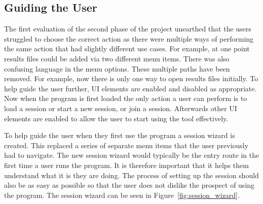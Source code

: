 \subsection{Guiding the User}

The first evaluation of the second phase of the project unearthed that the users struggled to choose the correct action as there were multiple ways of performing the same action that had slightly different use cases.  For example, at one point results files could be added via two different menu items.  There was also confusing language in the menu options.  These multiple paths have been removed. For example, now there is only one way to open results files initially.  To help guide the user further, \ac{UI} elements are enabled and disabled as appropriate.  Now when the program is first loaded the only action a user can perform is to load a session or start a new session, or join a session.  Afterwards other \ac{UI} elements are enabled to allow the user to start using the tool effectively.

To help guide the user when they first use the program a session wizard is created.  This replaced a series of separate menu items that the user previously had to navigate. The new session wizard would typically be the entry route in the first time a user runs the program.  It is therefore important that it helps them understand what it is they are doing.  The process of setting up the session should also be as easy as possible so that the user does not dislike the prospect of using the program.  The session wizard can be seen in Figure~\ref{fig:session_wizard}.

